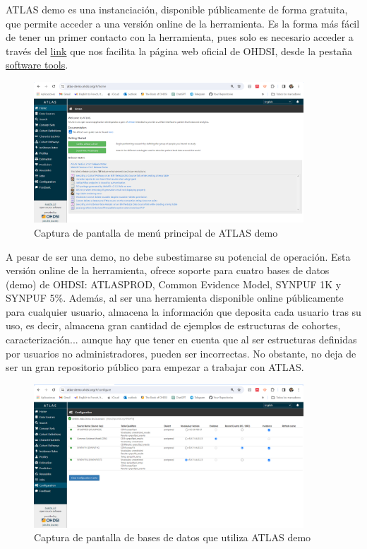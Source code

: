 \documentclass{article}
\begin{document}
ATLAS demo es una instanciación, disponible públicamente de forma gratuita, que permite acceder a una versión online de la herramienta. Es la forma más fácil de tener un primer contacto con la herramienta, pues solo es necesario acceder a través del  \href{https://atlas-demo.ohdsi.org/}{link} que nos facilita la página web oficial de OHDSI, desde la pestaña \href{https://atlas-demo.ohdsi.org/}{software tools}. \\

\begin{figure}[H]
    \centering
    \includegraphics[width=0.90\textwidth]{images/atlasDemo.png}
    \caption{Captura de pantalla de menú principal de ATLAS demo}
\end{figure}

A pesar de ser una demo, no debe subestimarse su potencial de operación. Esta versión online de la herramienta, ofrece soporte para cuatro bases de datos (demo) de OHDSI: ATLASPROD, Common Evidence Model, SYNPUF 1K y SYNPUF 5\%. Además, al ser una herramienta disponible online públicamente para cualquier usuario, almacena la información que deposita cada usuario tras su uso, es decir, almacena gran cantidad de ejemplos de estructuras de cohortes, caracterización... aunque hay que tener en cuenta que al ser estructuras definidas por usuarios no administradores, pueden ser incorrectas. No obstante, no deja de ser un gran repositorio público para empezar a trabajar con ATLAS. \\

\begin{figure}[H]
    \centering
    \includegraphics[width=0.90\textwidth]{images/atlasDemo(1).png}
    \caption{Captura de pantalla de bases de datos que utiliza ATLAS demo}
\end{figure}
\end{document}
